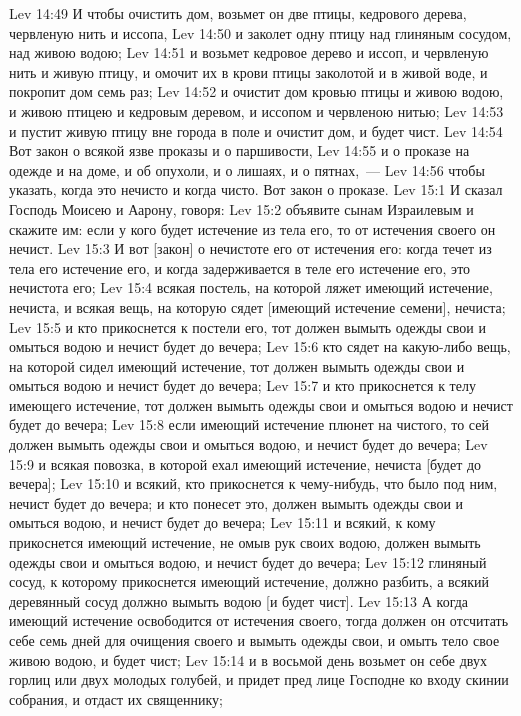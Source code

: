 \vs Lev 14:49 И чтобы очистить дом, возьмет он две птицы, кедрового дерева, червленую нить и иссопа,
\vs Lev 14:50 и заколет одну птицу над глиняным сосудом, над живою водою;
\vs Lev 14:51 и возьмет кедровое дерево и иссоп, и червленую нить и живую птицу, и омочит их в крови птицы заколотой и в живой воде, и покропит дом семь раз;
\vs Lev 14:52 и очистит дом кровью птицы и живою водою, и живою птицею и кедровым деревом, и иссопом и червленою нитью;
\vs Lev 14:53 и пустит живую птицу вне города в поле и очистит дом, и будет чист.
\rsbpar\vs Lev 14:54 Вот закон о всякой язве проказы и о паршивости,
\vs Lev 14:55 и о проказе на одежде и на доме, и об опухоли, и о лишаях, и о пятнах,~---
\vs Lev 14:56 чтобы указать, когда это нечисто и когда чисто. Вот закон о проказе.
\vs Lev 15:1 И сказал Господь Моисею и Аарону, говоря:
\vs Lev 15:2 объявите сынам Израилевым и скажите им: если у кого будет истечение из тела его, то от истечения своего он нечист.
\vs Lev 15:3 И вот [закон] о нечистоте его от истечения его: когда течет из тела его истечение его, и когда задерживается в теле его истечение его, это нечистота его;
\vs Lev 15:4 всякая постель, на которой ляжет имеющий истечение, нечиста, и всякая вещь, на которую сядет [имеющий истечение семени], нечиста;
\vs Lev 15:5 и кто прикоснется к постели его, тот должен вымыть одежды свои и омыться водою и нечист будет до вечера;
\vs Lev 15:6 кто сядет на какую-либо вещь, на которой сидел имеющий истечение, тот должен вымыть одежды свои и омыться водою и нечист будет до вечера;
\vs Lev 15:7 и кто прикоснется к телу имеющего истечение, тот должен вымыть одежды свои и омыться водою и нечист будет до вечера;
\vs Lev 15:8 если имеющий истечение плюнет на чистого, то сей должен вымыть одежды свои и омыться водою, и нечист будет до вечера;
\vs Lev 15:9 и всякая повозка, в которой ехал имеющий истечение, нечиста [будет до вечера];
\vs Lev 15:10 и всякий, кто прикоснется к чему-нибудь, что было под ним, нечист будет до вечера; и кто понесет это, должен вымыть одежды свои и омыться водою, и нечист будет до вечера;
\vs Lev 15:11 и всякий, к кому прикоснется имеющий истечение, не омыв рук своих водою, должен вымыть одежды свои и омыться водою, и нечист будет до вечера;
\vs Lev 15:12 глиняный сосуд, к которому прикоснется имеющий истечение, должно разбить, а всякий деревянный сосуд должно вымыть водою [и будет чист].
\vs Lev 15:13 А когда имеющий истечение освободится от истечения своего, тогда должен он отсчитать себе семь дней для очищения своего и вымыть одежды свои, и омыть тело свое живою водою, и будет чист;
\vs Lev 15:14 и в восьмой день возьмет он себе двух горлиц или двух молодых голубей, и придет пред лице Господне ко входу скинии собрания, и отдаст их священнику;
